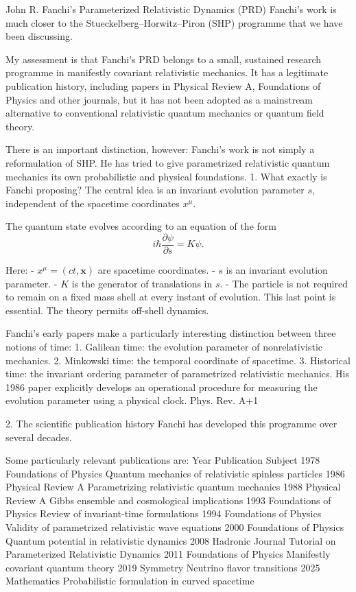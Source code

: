John R. Fanchi's Parameterized Relativistic Dynamics (PRD)
Fanchi's work is much closer to the Stueckelberg–Horwitz–Piron (SHP) programme that we have been discussing.

My assessment is that Fanchi's PRD belongs to a small, sustained research programme in manifestly covariant relativistic mechanics. It has a legitimate publication history, including papers in Physical Review A, Foundations of Physics and other journals, but it has not been adopted as a mainstream alternative to conventional relativistic quantum mechanics or quantum field theory.

There is an important distinction, however: Fanchi's work is not simply a reformulation of SHP. He has tried to give parametrized relativistic quantum mechanics its own probabilistic and physical foundations.
1. What exactly is Fanchi proposing?
The central idea is an invariant evolution parameter \(s\), independent of the spacetime coordinates \(x^\mu\).

The quantum state evolves according to an equation of the form
\[
i\hbar\frac{\partial\psi}{\partial s}
=K\psi.
\]

Here:
- \(x^\mu=(ct,\mathbf x)\) are spacetime coordinates.
- \(s\) is an invariant evolution parameter.
- \(K\) is the generator of translations in \(s\).
- The particle is not required to remain on a fixed mass shell at every instant of evolution.
This last point is essential. The theory permits off-shell dynamics.

Fanchi's early papers make a particularly interesting distinction between three notions of time:
1. Galilean time: the evolution parameter of nonrelativistic mechanics.
2. Minkowski time: the temporal coordinate of spacetime.
3. Historical time: the invariant ordering parameter of parametrized relativistic mechanics.
His 1986 paper explicitly develops an operational procedure for measuring the evolution parameter using a physical clock. 
Phys. Rev. A+1

2. The scientific publication history
Fanchi has developed this programme over several decades.

Some particularly relevant publications are:
Year	Publication	Subject
1978	Foundations of Physics	Quantum mechanics of relativistic spinless particles
1986	Physical Review A	Parametrizing relativistic quantum mechanics
1988	Physical Review A	Gibbs ensemble and cosmological implications
1993	Foundations of Physics	Review of invariant-time formulations
1994	Foundations of Physics	Validity of parametrized relativistic wave equations
2000	Foundations of Physics	Quantum potential in relativistic dynamics
2008	Hadronic Journal	Tutorial on Parameterized Relativistic Dynamics
2011	Foundations of Physics	Manifestly covariant quantum theory
2019	Symmetry	Neutrino flavor transitions
2025	Mathematics	Probabilistic formulation in curved spacetime

